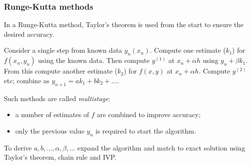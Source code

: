 \documentclass{beamer}
\begin{document}
\begin{frame}
  \frametitle{Runge-Kutta methods}

  In a Runge-Kutta method, Taylor's theorem is used from the start to
  ensure the desired accuracy. \pause

  \vspace{1ex}

  Consider a single step from known data $y_n(x_n)$. Compute one
  estimate ($k_1$) for $f(x_n, y_n)$ using the known data. \pause Then
  compute $y^{(1)}$ at $x_n + \alpha h$ using $y_n + \beta k_1$. \pause
  From this compute another estimate ($k_2$) for $f(x, y)$ at
  $x_n + \alpha h$. Compute $y^{(2)}$ etc; combine as $y_{n+1} = a k_1 + b k_2 + \dots$. \pause

  \vspace{1ex}

  Such methods are called \emph{multistage}:
  \begin{itemize}
  \item a number of estimates of $f$ are combined to
    improve accuracy;
  \item only the previous value $y_n$ is required to start the
    algorithm.
  \end{itemize}

  \vspace{1ex}

  To derive $a, b, \dots, \alpha, \beta, \dots$ expand the algorithm and match to
  exact solution using Taylor's theorem, chain rule and IVP.

\end{frame}
\end{document}
